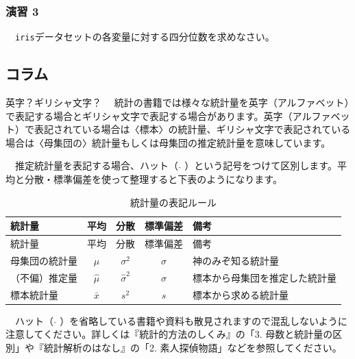\documentclass[
  12pt,
]{book}
\begin{document}
\hypertarget{ux6f14ux7fd2-3}{%
\subsubsection*{演習 3}\label{ux6f14ux7fd2-3}}

　\texttt{iris}データセットの各変量に対する四分位数を求めなさい。

\newpage

\hypertarget{ux30b3ux30e9ux30e0-1}{%
\subsection*{コラム}\label{ux30b3ux30e9ux30e0-1}}

\begin{info-box}{英字？ギリシャ文字？}
　統計の書籍では様々な統計量を英字（アルファベット）で表記する場合とギリシャ文字で表記する場合があります。英字（アルファベット）で表記されている場合は〈標本〉の統計量、ギリシャ文字で表記されている場合は〈母集団の〉統計量もしくは母集団の推定統計量を意味しています。

　推定統計量を表記する場合、ハット（ \(\hat{}\) ）という記号をつけて区別します。平均と分散・標準偏差を使って整理すると下表のようになります。

\begin{longtable}[]{@{}lcccl@{}}
\caption{統計量の表記ルール}\tabularnewline
\toprule
統計量 & 平均 & 分散 & 標準偏差 & 備考 \\
\midrule
\endfirsthead
\toprule
統計量 & 平均 & 分散 & 標準偏差 & 備考 \\
\midrule
\endhead
母集団の統計量 & \(\mu\) & \(\sigma^2\) & \(\sigma\) & 神のみぞ知る統計量 \\
（不偏）推定量 & \(\hat{\mu}\) & \(\hat{\sigma}^2\) & \(\hat{\sigma}\) & 標本から母集団を推定した統計量 \\
標本統計量 & \(\bar{x}\) & \(s^2\) & \(s\) & 標本から求める統計量 \\
\bottomrule
\end{longtable}

　ハット（ \(\hat{}\) ）を省略している書籍や資料も散見されますので混乱しないように注意してください。詳しくは『統計的方法のしくみ』\citep{ToukeitekiHouhounoSikumi:jbook}の「3. 母数と統計量の区別」や『統計解析のはなし』\citep{ToukeiKaisekinoHanashi}の「2. 素人探偵物語」などを参照してください。

\end{info-box}
\end{document}
